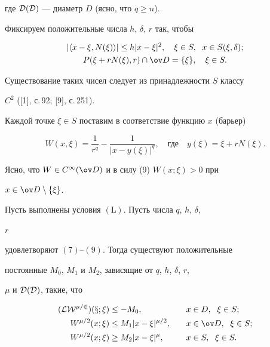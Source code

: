 где $\cal D(D)$ --- диаметр $D$ (ясно, что $q\ge n$). 


Фиксируем положительные числа $h$, $\delta$, $r$ так, чтобы


\begin{gather} 


|\la x-\xi,N(\xi)\ra|\le h|x-\xi|^2,\quad 


\xi\in S,\ \; x\in S(\xi,\delta);\\ 


% 


P(\xi+r N(\xi),r)\cap\ov D=\{\xi\},\quad \xi\in S. 


\end{gather} 


Существование таких чисел следует из принадлежности $S$ классу 


$C^2$ ([1], с.\,92; [9], с.\,251). 


 


Каждой точке $\xi\in S$ поставим в соответствие функцию $x$ (барьер)


\begin{equation} 


W(x,\xi)=\frac{1}{r^q}-\frac{1}{|x-y(\xi)|^q},\quad 


\text{где}\quad 


y(\xi)=\xi+r N(\xi). 


\end{equation} 


Ясно, что $W\in C^\infty(\ov D)$ и в силу (9)\; $W(x;\xi)>0$ при 


$x\in\ov D\setminus\{\xi\}$. 


 


\begin{prop} 


Пусть выполнены условия $(\mathrm L)$. Пусть числа $q$, $h$, $\delta$, 


$r$ 


удовлетворяют $(7)$--$(9)$. Тогда существуют положительные 


постоянные $M_0$, $M_1$ и $M_2$, зависящие от $q$, $h$, $\delta$, $r$, 


$\mu$ и $\cal D(D)$, такие, что 


\begin{alignat}{2} 


(\cal L W^{\mu/2})(x;\xi)&\le-M_0, &\quad x&\in D,\ \; \xi\in S;\\ 


% 


W^{\mu/2}(x;\xi)&\le M_1|x-\xi|^{\mu/2}, &\quad x&\in\ov D, 


\ \; \xi\in S; \\ 


% 


W^{\mu/2}(x;\xi)&\ge M_2|x-\xi|^\mu, &\quad x&\in S,\ \; \xi\in S. 


\end{alignat} 


\end{prop} 


